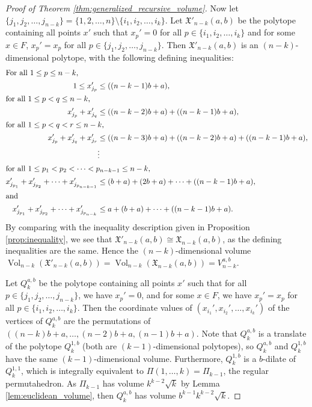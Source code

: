 \documentclass[11pt]{amsart}
\theoremstyle{definition}
\newcommand{\0}{\emptyset}
\newcommand{\X}{\mathfrak{X}}
\DeclareMathOperator{\Vol}{Vol}
\begin{document}
\begin{proof}[Proof of Theorem \ref{thm:generalized_recursive_volume}]
Now let $\{j_1, j_2, \ldots, j_{n-k}\} = \{1,2,\ldots, n\} \setminus \{i_1, i_2, \ldots, i_k\}$. Let $\X'_{n-k}(a,b)$ be the polytope containing all points $x'$ such that $x_p' = 0$ for all $p \in \{i_1, i_2, \ldots, i_k\}$ and for some $x \in F$, $x_p' = x_p$ for all $p \in \{j_1, j_2, \ldots, j_{n-k}\}$. 
Then $\X'_{n-k}(a,b)$ is an $(n-k)$-dimensional polytope, with the following defining inequalities:
\begin{align*}
\intertext{\emph{For all} $1 \leq p \leq n-k$,}
    1 \leq x_{j_p}' &\leq ((n-k-1)b+a),  \\
\intertext{\emph{for all} $1 \leq p < q \leq n-k$,}    
    x_{j_p}' + x_{j_q}' &\leq ((n-k-2)b+a) + ((n-k-1)b+a),\\
\intertext{\emph{for all} $1 \leq p < q < r \leq n-k$,}    
    x_{j_p}' + x_{j_q}' + x_{j_r}' &\leq ((n-k-3)b+a) + ((n-k-2)b+a) + ((n-k-1)b+a),\\
    &\vdots\\
\intertext{\emph{for all} $1 \leq p_1 < p_2 < \cdots <p_{n-k-1} \leq n-k$,}
    x_{j_{p_1}}' + x_{j_{p_2}}' + \cdots + x_{j_{p_{n-k-1}}}' &\leq (b+a) + (2b+a) + \cdots + ((n-k-1)b+a),\\
\intertext{\emph{and}}    
    x_{j_{p_1}}' + x_{j_{p_2}}' + \cdots + x_{j_{p_{n-k}}}' &\leq a + (b+a) + \cdots + ((n-k-1)b+a).
\end{align*}
By comparing with the inequality description given in Proposition \ref{prop:inequality}, we see that $\X'_{n-k}(a,b) \cong \X_{n-k}(a,b)$, as the defining inequalities are the same. 
Hence the $(n-k)$-dimensional volume $\Vol_{n-k}(\X'_{n-k}(a,b)) = \Vol_{n-k}(\X_{n-k}(a,b)) = V_{n-k}^{a,b}$.

Let $Q^{a,b}_k$ be the polytope containing all points $x'$ such that for all $p \in \{j_1, j_2, \ldots, j_{n-k}\}$, we have $x_p'=0$, and for some $x \in F$, we have $x_p' = x_p$ for all $p \in \{i_1, i_2, \ldots, i_k\}$. 
Then the coordinate values of $(x_{i_1}', x_{i_2}', \ldots, x_{i_k}')$ of the vertices of $Q^{a,b}_k$ are the permutations of $((n-k)b+a, \ldots, (n-2)b + a, (n-1)b+a)$.
Note that $Q^{a,b}_k$ is a translate of the polytope $Q^{1,b}_k$ (both are $(k-1)$-dimensional polytopes), so $Q^{a,b}_k$ and $Q^{1,b}_k$ have the same $(k-1)$-dimensional volume.
Furthermore, $Q^{1,b}_k$ is a $b$-dilate of $Q^{1,1}_k$, which is integrally equivalent to $\Pi(1, \ldots, k) = \Pi_{k-1}$, the regular permutahedron. 
As $\Pi_{k-1}$ has volume $k^{k-2} \sqrt{k}$ by Lemma \ref{lem:euclidean_volume}, then $Q^{a,b}_k$ has volume $b^{k-1}k^{k-2} \sqrt{k}$.


\end{proof}
\end{document}
